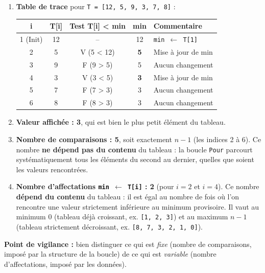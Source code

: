 \documentclass[11pt]{article}
\begin{document}
\begin{corrige}
\begin{enumerate}
\item \textbf{Table de trace} pour \texttt{T = [12, 5, 9, 3, 7, 8]} :
\begin{center}
\begin{tabularx}{\linewidth}{|c|c|c|c|X|}
\hline
\rowcolor{popblueL} \textbf{i} & \textbf{T[i]} & \textbf{Test T[i] < min} & \textbf{min} & \textbf{Commentaire} \\
\hline
1 (Init) & 12 & -- & 12 & \texttt{min $\leftarrow$ T[1]} \\
\hline
2 & 5 & V (5 < 12) & \textbf{5} & Mise à jour de min \\
3 & 9 & F (9 > 5) & 5 & Aucun changement \\
4 & 3 & V (3 < 5) & \textbf{3} & Mise à jour de min \\
5 & 7 & F (7 > 3) & 3 & Aucun changement \\
6 & 8 & F (8 > 3) & 3 & Aucun changement \\
\hline
\end{tabularx}
\end{center}
\item \textbf{Valeur affichée : 3}, qui est bien le plus petit élément du tableau.
\item \textbf{Nombre de comparaisons : 5}, soit exactement $n - 1$ (les indices 2 à 6). Ce nombre \textbf{ne dépend pas du contenu} du tableau : la boucle \texttt{Pour} parcourt systématiquement tous les éléments du second au dernier, quelles que soient les valeurs rencontrées.
\item \textbf{Nombre d'affectations \texttt{min $\leftarrow$ T[i]} : 2} (pour $i=2$ et $i=4$). Ce nombre \textbf{dépend du contenu} du tableau : il est égal au nombre de fois où l'on rencontre une valeur strictement inférieure au minimum provisoire. Il vaut au minimum 0 (tableau déjà croissant, ex. \texttt{[1, 2, 3]}) et au maximum $n-1$ (tableau strictement décroissant, ex. \texttt{[8, 7, 3, 2, 1, 0]}).
\end{enumerate}
\textbf{Point de vigilance :} bien distinguer ce qui est \emph{fixe} (nombre de comparaisons, imposé par la structure de la boucle) de ce qui est \emph{variable} (nombre d'affectations, imposé par les données).
\end{corrige}
\end{document}
